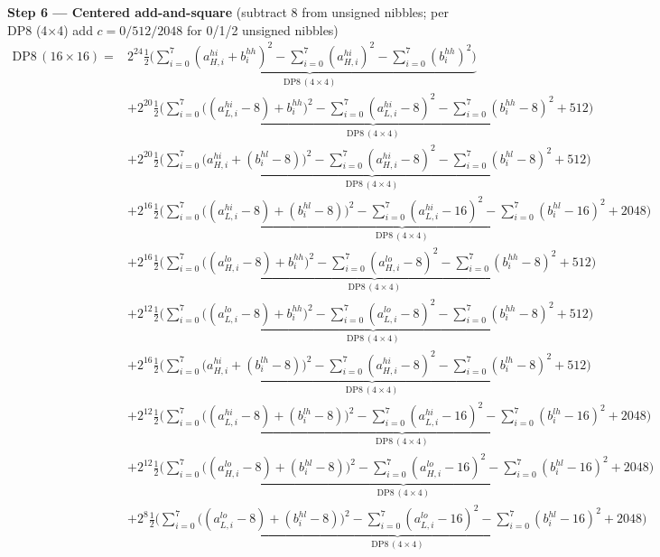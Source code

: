 \documentclass[fleqn]{article}
\newcommand{\DPop}[3]{\mathrm{DP#1}\,(#2\!\times\!#3)}
\begin{document}
\textbf{Step 6 --- Centered add-and-square}\quad
{\small(subtract $8$ from unsigned nibbles; per DP8 (4$\times$4) add $c=0/512/2048$ for 0/1/2 unsigned nibbles)}
\begin{align*}
\DPop{8}{16}{16} = {}
  & 2^{24}\underbrace{\tfrac12\Big(\sum_{i=0}^{7}(a_{H,i}^{hi}{+}b_i^{hh})^2 - \sum_{i=0}^{7}(a_{H,i}^{hi})^2 - \sum_{i=0}^{7}(b_i^{hh})^2\Big)}_{\DPop{8}{4}{4}} \\[0.5em]
  & + 2^{20}\underbrace{\tfrac12\Big(\sum_{i=0}^{7}\big((a_{L,i}^{hi}{-}8){+}b_i^{hh}\big)^2 - \sum_{i=0}^{7}(a_{L,i}^{hi}{-}8)^2 - \sum_{i=0}^{7}(b_i^{hh}{-}8)^2 + 512\Big)}_{\DPop{8}{4}{4}} \\[0.5em]
  & + 2^{20}\underbrace{\tfrac12\Big(\sum_{i=0}^{7}\big(a_{H,i}^{hi}{+}(b_i^{hl}{-}8)\big)^2 - \sum_{i=0}^{7}(a_{H,i}^{hi}{-}8)^2 - \sum_{i=0}^{7}(b_i^{hl}{-}8)^2 + 512\Big)}_{\DPop{8}{4}{4}} \\[0.5em]
  & + 2^{16}\underbrace{\tfrac12\Big(\sum_{i=0}^{7}\big((a_{L,i}^{hi}{-}8){+}(b_i^{hl}{-}8)\big)^2 - \sum_{i=0}^{7}(a_{L,i}^{hi}{-}16)^2 - \sum_{i=0}^{7}(b_i^{hl}{-}16)^2 + 2048\Big)}_{\DPop{8}{4}{4}} \\[0.5em]
  & + 2^{16}\underbrace{\tfrac12\Big(\sum_{i=0}^{7}\big((a_{H,i}^{lo}{-}8){+}b_i^{hh}\big)^2 - \sum_{i=0}^{7}(a_{H,i}^{lo}{-}8)^2 - \sum_{i=0}^{7}(b_i^{hh}{-}8)^2 + 512\Big)}_{\DPop{8}{4}{4}} \\[0.5em]
  & + 2^{12}\underbrace{\tfrac12\Big(\sum_{i=0}^{7}\big((a_{L,i}^{lo}{-}8){+}b_i^{hh}\big)^2 - \sum_{i=0}^{7}(a_{L,i}^{lo}{-}8)^2 - \sum_{i=0}^{7}(b_i^{hh}{-}8)^2 + 512\Big)}_{\DPop{8}{4}{4}} \\[0.5em]
  & + 2^{16}\underbrace{\tfrac12\Big(\sum_{i=0}^{7}\big(a_{H,i}^{hi}{+}(b_i^{lh}{-}8)\big)^2 - \sum_{i=0}^{7}(a_{H,i}^{hi}{-}8)^2 - \sum_{i=0}^{7}(b_i^{lh}{-}8)^2 + 512\Big)}_{\DPop{8}{4}{4}} \\[0.5em]
  & + 2^{12}\underbrace{\tfrac12\Big(\sum_{i=0}^{7}\big((a_{L,i}^{hi}{-}8){+}(b_i^{lh}{-}8)\big)^2 - \sum_{i=0}^{7}(a_{L,i}^{hi}{-}16)^2 - \sum_{i=0}^{7}(b_i^{lh}{-}16)^2 + 2048\Big)}_{\DPop{8}{4}{4}} \\[0.5em]
  & + 2^{12}\underbrace{\tfrac12\Big(\sum_{i=0}^{7}\big((a_{H,i}^{lo}{-}8){+}(b_i^{hl}{-}8)\big)^2 - \sum_{i=0}^{7}(a_{H,i}^{lo}{-}16)^2 - \sum_{i=0}^{7}(b_i^{hl}{-}16)^2 + 2048\Big)}_{\DPop{8}{4}{4}} \\[0.5em]
  & + 2^{8}\underbrace{\tfrac12\Big(\sum_{i=0}^{7}\big((a_{L,i}^{lo}{-}8){+}(b_i^{hl}{-}8)\big)^2 - \sum_{i=0}^{7}(a_{L,i}^{lo}{-}16)^2 - \sum_{i=0}^{7}(b_i^{hl}{-}16)^2 + 2048\Big)}_{\DPop{8}{4}{4}} \\[0.5em]

\end{align*}
\end{document}
